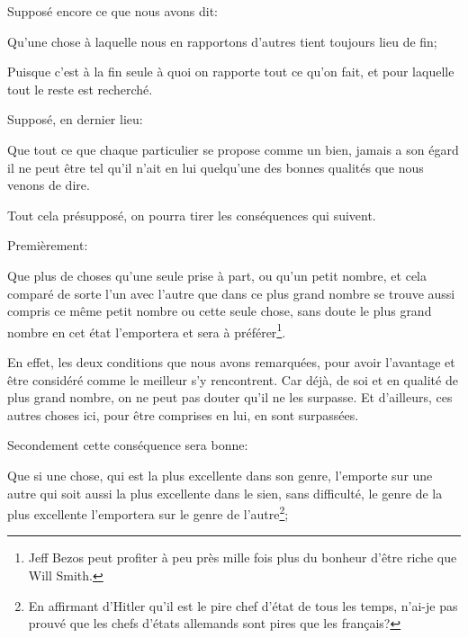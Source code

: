 Supposé encore ce que nous avons dit: 

\begin{emphpar}
	Qu'une chose à laquelle nous en rapportons d'autres tient toujours lieu de fin;
\end{emphpar}

Puisque c'est à la fin seule à quoi on rapporte tout ce qu'on fait, et pour laquelle tout le reste est recherché.

Supposé, en dernier lieu:

\begin{emphpar}
	Que tout ce que chaque particulier se propose comme un bien, jamais a son égard il ne peut être tel qu'il n'ait
	en lui quelqu'une des bonnes qualités que nous venons de dire.
\end{emphpar}

Tout cela présupposé, on pourra tirer les conséquences qui suivent.

\bigbreak 

Premièrement:

\begin{lieu}
	Que plus de choses qu'une seule prise à part, ou qu'un petit nombre, et cela comparé de sorte l'un avec l'autre
	que dans ce plus grand nombre se trouve aussi compris ce même petit nombre ou cette seule chose, sans doute le plus
	grand nombre en cet état l'emportera et sera à préférer\footnote{Jeff Bezos peut profiter à peu près mille fois
	plus du bonheur d’être riche que Will Smith.}.
\end{lieu}

En effet, les deux conditions que nous avons remarquées, pour avoir l'avantage et être considéré comme le meilleur s'y
rencontrent. Car déjà, de soi et en qualité de plus grand nombre, on ne peut pas douter qu'il ne les surpasse. Et
d'ailleurs, ces autres choses ici, pour être comprises en lui, en sont surpassées.

\bigbreak 

Secondement cette conséquence sera bonne:

\begin{lieu}
	Que si une chose, qui est la plus excellente dans son genre, l'emporte sur une autre qui soit aussi la plus excellente
	dans le sien, sans difficulté, le genre de la plus excellente l'emportera sur le genre de l'autre\footnote{En affirmant
	d'Hitler qu'il est le pire chef d'état de tous les temps, n'ai-je pas prouvé que les chefs d'états allemands sont pires
	que les français?};
\end{lieu}

